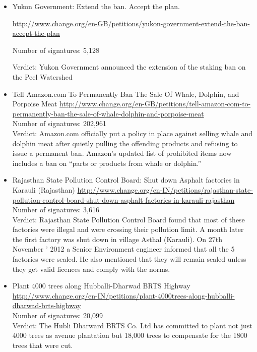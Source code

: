 \begin{itemize}
\item Yukon Government: Extend the ban. Accept the plan.
\par\vspace{0.1cm}
\url{http://www.change.org/en-GB/petitions/yukon-government-extend-the-ban-accept-the-plan}
\par\vspace{0.1cm}
Number of signatures:	5,128
\par\vspace{0.1cm}
Verdict: Yukon Government announced the extension of the staking ban on the Peel Watershed

\item Tell Amazon.com To Permanently Ban The Sale Of Whale, Dolphin, and Porpoise Meat 
\url{http://www.change.org/en-GB/petitions/tell-amazon-com-to-permanently-ban-the-sale-of-whale-dolphin-and-porpoise-meat}
\\Number of signatures: 202,961
\\Verdict: Amazon.com officially put a policy in place against selling whale and dolphin meat after quietly pulling the offending products and refusing to issue a permanent ban. Amazon’s updated list of prohibited items now includes a ban on “parts or products from whale or dolphin.”

\item Rajasthan State Pollution Control Board: Shut down Asphalt factories in Karauli (Rajasthan)
\url{http://www.change.org/en-IN/petitions/rajasthan-state-pollution-control-board-shut-down-asphalt-factories-in-karauli-rajasthan}
\\Number of signatures: 3,616
\\Verdict: Rajasthan State Pollution Control Board found that most of these factories were illegal and were crossing their pollution limit. A month later the first factory was shut down in village Asthal (Karauli). On 27th November ' 2012 a Senior Environment engineer informed that all the 5 factories were sealed. He also mentioned that they will remain sealed unless they get valid licences and comply with the norms.

\item Plant 4000 trees along Hubballi-Dharwad BRTS Highway
\url{http://www.change.org/en-IN/petitions/plant-4000trees-along-hubballi-dharwad-brts-highway}
\\Number of signatures: 20,099
\\Verdict: The Hubli Dharward BRTS Co. Ltd has committed to plant not just 4000 trees as avenue plantation but 18,000 trees to compensate for the 1800 trees that were cut.


\end{itemize}
